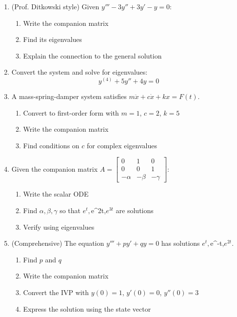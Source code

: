 \documentclass[12pt]{article}
\begin{document}
\begin{enumerate}[resume]
\item (Prof. Ditkowski style) Given $y''' - 3y'' + 3y' - y = 0$:
\begin{enumerate}[label=(\alph*)]
\item Write the companion matrix
\item Find its eigenvalues
\item Explain the connection to the general solution
\end{enumerate}

\item Convert the system and solve for eigenvalues:
$$y^{(4)} + 5y'' + 4y = 0$$

\item A mass-spring-damper system satisfies $m\ddot{x} + c\dot{x} + kx = F(t)$.
\begin{enumerate}[label=(\alph*)]
\item Convert to first-order form with $m=1$, $c=2$, $k=5$
\item Write the companion matrix
\item Find conditions on $c$ for complex eigenvalues
\end{enumerate}

\item Given the companion matrix $A = \begin{bmatrix} 0 & 1 & 0 \\ 0 & 0 & 1 \\ -\alpha & -\beta & -\gamma \end{bmatrix}$:
\begin{enumerate}[label=(\alph*)]
\item Write the scalar ODE
\item Find $\alpha, \beta, \gamma$ so that $e^{t}, $e^{2t},$ e^{3t}$ are solutions
\item Verify using eigenvalues
\end{enumerate}

\item (Comprehensive) The equation $y''' + py' + qy = 0$ has solutions $e^{t}, $e^{-t},$ e^{2t}$.
\begin{enumerate}[label=(\alph*)]
\item Find $p$ and $q$
\item Write the companion matrix
\item Convert the IVP with $y(0) = 1$, $y'(0) = 0$, $y''(0) = 3$
\item Express the solution using the state vector
\end{enumerate}
\end{enumerate}
\end{document}
